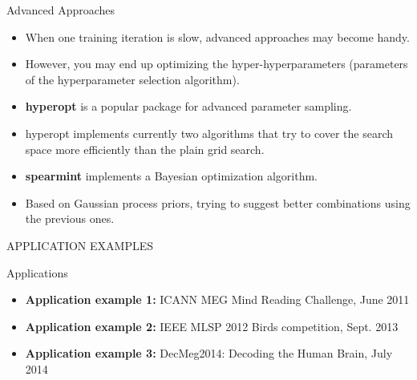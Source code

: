 \documentclass[10pt, aspectratio=169]{beamer} %
\begin{document}
\begin{frame}{Advanced Approaches}
	\begin{itemize}
		\item When one training iteration is slow, advanced approaches may become handy.
		\item However, you may end up optimizing the hyper-hyperparameters (parameters of the
		hyperparameter selection algorithm).
		\item \textbf{hyperopt} is a popular package for advanced parameter sampling.
		\item hyperopt implements currently two algorithms that try to cover the search space
		more efficiently than the plain grid search.
		\item \textbf{spearmint} implements a Bayesian optimization algorithm.
		\item Based on Gaussian process priors, trying to suggest better combinations using the
		previous ones.		
		\end{itemize}
\end{frame}

\begin{frame}
\vspace*{2cm}
\centerline{\Large APPLICATION EXAMPLES}
\end{frame}


\begin{frame}
{Applications}
\begin{itemize}
\item \textbf{Application example 1:} ICANN MEG Mind Reading Challenge, June 2011
\item \textbf{Application example 2:} IEEE MLSP 2012 Birds competition, Sept. 2013
\item \textbf{Application example 3:} DecMeg2014: Decoding the Human Brain, July 2014
\end{itemize}
\end{frame}
\end{document}
